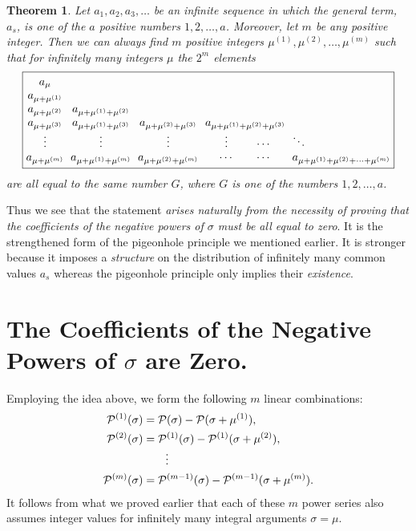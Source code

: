 \documentclass{article}
\theoremstyle{plain}
\newtheorem{thm}{Theorem}
\theoremstyle{definition}
\begin{document}
\begin{thm} %
Let $a_1,a_2,a_3,\ldots$ be an infinite sequence in which the general
term, $a_s$, is one of the $a$ positive numbers $1,2,\ldots,a$.
Moreover, let $m$ be any positive integer. Then we can always find $m$
positive integers $\mu^{(1)},\mu^{(2)},\ldots,\mu^{(m)}$ such that for
infinitely many integers $\mu$ the $2^m$ elements
\[
\setlength{\arraycolsep}{3pt} %
\boxed{\begin{matrix}
a_ \mu  &  &  &  & 
\\
a_{\mu + \mu^{(1)}} &  &  &  &
\\
a_{\mu + \mu^{(2)}} & a_{\mu + \mu^{(1)} + \mu^{(2)}}  &  &  & 
\\
a_{\mu + \mu^{(3)}} & a_{\mu + \mu^{(1)} + \mu^{(3)}} 
& a_{\mu + \mu^{(2)} + \mu^{(3)}}
& a_{\mu + \mu^{(1)} + \mu^{(2)} + \mu^{(3)}} & 
\\
\vdots & \vdots & \vdots & \enspace\vdots \hspace*{2.4em} \cdots 
& \ddots \hfill 
\\
a_{\mu + \mu^{(m)}} & a_{\mu + \mu^{(1)} + \mu^{(m)}}
& a_{\mu + \mu^{(2)} + \mu^{(m)}} & \cdots \qquad \cdots
& a_{\mu + \mu^{(1)} + \mu^{(2)} +\cdots+ \mu^{(m)}} 
\end{matrix}}
\]
are all equal to the same number $G$, where $G$ is one of the numbers
$1,2,\dots,a$.
\end{thm}


Thus we see that the statement \emph{arises naturally from the
necessity of proving that the coefficients of the negative powers of
$\sigma$ must be all equal to zero}. It is the strengthened form of
the pigeonhole principle we mentioned earlier. It is stronger because
it imposes a \emph{structure} on the distribution of infinitely many
common values $a_s$ whereas the pigeonhole principle only implies
their \emph{existence}.



\section{The Coefficients of the Negative Powers of $\sigma$ are Zero.}
\label{sec:neg}

Employing the idea above, we form the following $m$ linear
combinations:
\begin{align*}
\mathcal{P}^{(1)}(\sigma)
&= \mathcal{P}(\sigma) - \mathcal{P}(\sigma + \mu^{(1)}),
\\
\mathcal{P}^{(2)}(\sigma)
&= \mathcal{P}^{(1)}(\sigma) - \mathcal{P}^{(1)}(\sigma + \mu^{(2)}),
\\[-\jot]
 \qquad &\qquad \vdots
\\
\mathcal{P}^{(m)}(\sigma) 
&= \mathcal{P}^{(m-1)}(\sigma) 
- \mathcal{P}^{(m-1)}(\sigma + \mu^{(m)}). 
\end{align*}
It follows from what we proved earlier that each of these $m$ power
series also assumes integer values for infinitely many integral
arguments $\sigma = \mu$.
\end{document}
